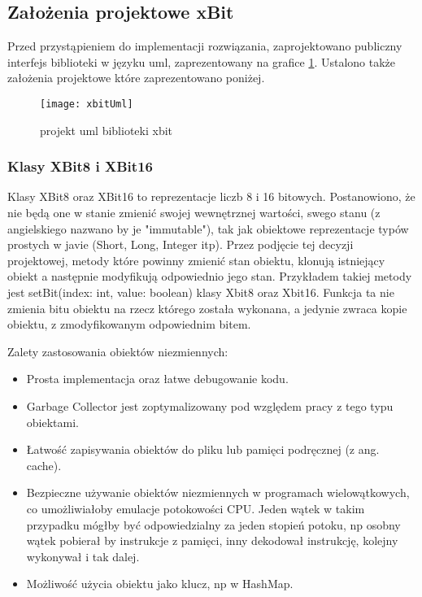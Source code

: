 	\subsection{Założenia projektowe xBit}
	Przed przystąpieniem do implementacji rozwiązania, zaprojektowano publiczny interfejs biblioteki w języku uml, zaprezentowany na grafice \ref{img:xbitUml}. Ustalono także założenia projektowe które zaprezentowano poniżej. 
	
	\begin{figure}[h]
		\centering
		\texttt{[image: xbitUml]}
		\caption{projekt uml biblioteki xbit}
		\label{img:xbitUml}
	\end{figure}
	
	\subsubsection{Klasy XBit8 i XBit16}
	Klasy XBit8 oraz XBit16 to reprezentacje liczb 8 i 16 bitowych. Postanowiono, że nie będą one w stanie zmienić swojej wewnętrznej wartości, swego stanu (z angielskiego nazwano by je "immutable"), tak jak obiektowe reprezentacje typów prostych w javie (Short, Long, Integer itp).  Przez podjęcie tej decyzji projektowej, metody które powinny zmienić stan obiektu, klonują istniejący obiekt a następnie modyfikują odpowiednio jego stan. Przykładem takiej metody jest setBit(index: int, value: boolean) klasy Xbit8 oraz Xbit16. Funkcja ta nie zmienia bitu obiektu na rzecz którego została wykonana, a jedynie zwraca kopie obiektu, z zmodyfikowanym odpowiednim bitem. 
	
	Zalety zastosowania obiektów niezmiennych:
	\begin{itemize} 
		\item Prosta implementacja oraz łatwe debugowanie kodu.
		\item Garbage Collector jest zoptymalizowany pod względem pracy z tego typu obiektami.   
		\item Łatwość zapisywania obiektów do pliku lub pamięci podręcznej (z ang. cache).
		\item Bezpieczne używanie obiektów niezmiennych w programach wielowątkowych, co umożliwiałoby emulacje potokowości CPU. Jeden wątek w takim przypadku mógłby być odpowiedzialny za jeden stopień potoku, np osobny wątek pobierał by instrukcje z pamięci, inny dekodował instrukcję, kolejny wykonywał i tak dalej.
		\item Możliwość użycia obiektu jako klucz, np w HashMap. 
	\end{itemize}
	
